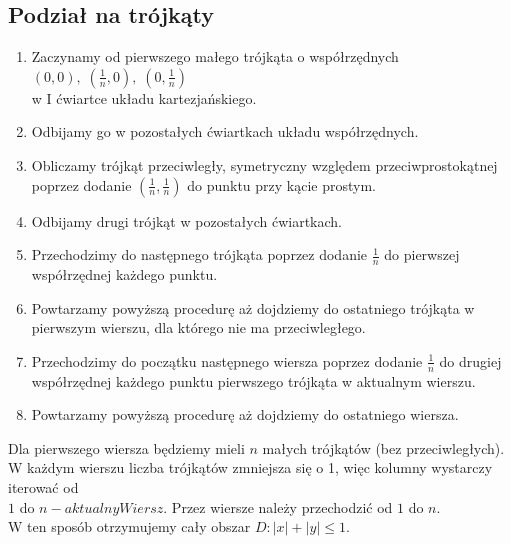 \documentclass[12pt, leqno]{article}
\begin{document}
            \subsection*{Podział na trójkąty}
            \begin{algorithm} 
                \vspace{2mm}
                \begin{enumerate}
                \item{Zaczynamy od pierwszego małego trójkąta o współrzędnych $(0,0),\; (\frac{1}{n}, 0),\; 
                    (0, \frac{1}{n})$\\ w I ćwiartce układu kartezjańskiego.}
                \item{Odbijamy go w pozostałych ćwiartkach układu współrzędnych.}
                \item{Obliczamy trójkąt przeciwległy, symetryczny względem przeciwprostokątnej poprzez 
                      dodanie $(\frac{1}{n}, \frac{1}{n})$ do punktu przy kącie prostym.}
                \item{Odbijamy drugi trójkąt w pozostałych ćwiartkach.}
                \item{Przechodzimy do następnego trójkąta poprzez dodanie $\frac{1}{n}$ do pierwszej
                      współrzędnej każdego punktu.}
                \item{Powtarzamy powyższą procedurę aż dojdziemy do ostatniego trójkąta w pierwszym wierszu, 
                    dla którego nie ma przeciwległego.} 
                \item{Przechodzimy do początku następnego wiersza poprzez dodanie $\frac{1}{n}$ do drugiej
                      współrzędnej każdego punktu pierwszego trójkąta w aktualnym wierszu.}
                \item{Powtarzamy powyższą procedurę aż dojdziemy do ostatniego wiersza.}
                \end{enumerate}
                \vspace{2mm}
            \end{algorithm}
            Dla pierwszego wiersza będziemy mieli $n$ małych trójkątów (bez przeciwległych).
            W każdym wierszu liczba trójkątów zmniejsza się o 1, więc kolumny wystarczy iterować od\\
            $1$ do $n - aktualnyWiersz$. Przez wiersze należy przechodzić od $1$ do $n$.\\
            W ten sposób otrzymujemy cały obszar $D: |x| + |y| \leq 1$.
\end{document}
